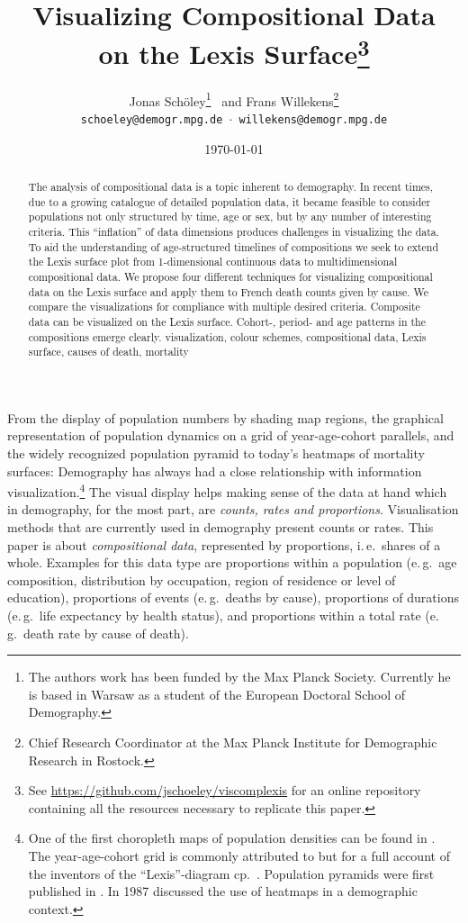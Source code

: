 \documentclass[a4paper, 12pt]{scrartcl}
\title{Visualizing Compositional Data\\on the Lexis Surface\footnote{See \url{https://github.com/jschoeley/viscomplexis} for an online repository containing all the resources necessary to replicate this paper.}}
\author{Jonas Schöley\footnote{The authors work has been funded by the Max Planck Society. Currently he is based in Warsaw as a student of the European Doctoral School of Demography.} \, and Frans Willekens\footnote{Chief Research Coordinator at the Max Planck Institute for Demographic Research in Rostock.}\\
\texttt{schoeley@demogr.mpg.de $\cdot$ willekens@demogr.mpg.de}}
\date{\today}
\begin{document}
\maketitle

\begin{abstract}

The analysis of compositional data is a topic inherent to demography. In recent times, due to a growing catalogue of detailed population data, it became feasible to consider populations not only structured by time, age or sex, but by any number of interesting criteria. This \enquote{inflation} of data dimensions produces challenges in visualizing the data.
To aid the understanding of age-structured timelines of compositions we seek to extend the Lexis surface plot from 1-dimensional continuous data to multidimensional compositional data.
We propose four different techniques for visualizing compositional data on the Lexis surface and apply them to French death counts given by cause. We compare the visualizations for compliance with multiple desired criteria.
Composite data can be visualized on the Lexis surface. Cohort-, period- and age patterns in the compositions emerge clearly.
visualization, colour schemes, compositional data, Lexis surface, causes of death, mortality

\end{abstract}

\clearpage


\noindent From the display of population numbers by shading map regions, the graphical representation of population dynamics on a grid of year-age-cohort parallels, and the widely recognized population pyramid to today's heatmaps of mortality surfaces: Demography has always had a close relationship with information visualization.\footnote{One of the first choropleth maps of population densities can be found in \textcite{Dangeville1836}. The year-age-cohort grid is commonly attributed to \textcite{Lexis1875} but for a full account of the inventors of the \enquote{Lexis}-diagram cp.~\textcite{Vandeschrick2001}. Population pyramids were first published in \textcite{Walker1874}. In 1987 \textcite{Vaupel1987} discussed the use of heatmaps in a demographic context.} The visual display helps making sense of the data at hand which in demography, for the most part, are \emph{counts, rates and proportions}. Visualisation methods that are currently used in demography present counts or rates. This paper is about \emph{compositional data}, represented by proportions, i.\,e.~shares of a whole. Examples for this data type are proportions within a population (e.\,g.~age composition, distribution by occupation, region of residence or level of education), proportions of events (e.\,g.~deaths by cause), proportions of durations (e.\,g.~life expectancy by health status), and proportions within a total rate (e.\,g.~death rate by cause of death).
\end{document}

